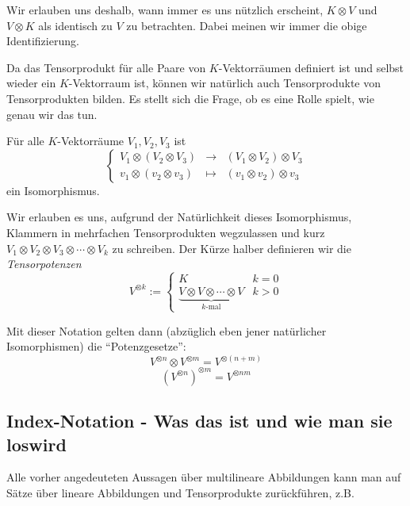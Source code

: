 \begin{remark}
Wir erlauben uns deshalb, wann immer es uns nützlich erscheint, $K\otimes V$ und $V\otimes K$ als identisch zu $V$ zu betrachten. Dabei meinen wir immer die obige Identifizierung.
\end{remark}

\begin{remark}
Da das Tensorprodukt für alle Paare von $K$-Vektorräumen definiert ist und selbst wieder ein $K$-Vektorraum ist, können wir natürlich auch Tensorprodukte von Tensorprodukten bilden. Es stellt sich die Frage, ob es eine Rolle spielt, wie genau wir das tun.
\end{remark}

\begin{lemmadef}
Für alle $K$-Vektorräume $V_1, V_2, V_3$ ist
\[\left\lbrace\begin{array}{rcl}
V_1\otimes(V_2\otimes V_3) &\to& (V_1\otimes V_2)\otimes V_3 \\
v_1\otimes (v_2\otimes v_3) &\mapsto& (v_1\otimes v_2)\otimes v_3
\end{array}\right.\]
ein Isomorphismus.

Wir erlauben es uns, aufgrund der Natürlichkeit dieses Isomorphismus, Klammern in mehrfachen Tensorprodukten wegzulassen und kurz $V_1\otimes V_2\otimes V_3\otimes\cdots\otimes V_k$ zu schreiben. Der Kürze halber definieren wir die \emph{Tensorpotenzen} 
\[V^{\otimes k} := \begin{cases} K & k=0 \\ 
\underbrace{V\otimes V\otimes\cdots\otimes V}_{k\text{-mal}} & k>0\end{cases}\]
\end{lemmadef}

\begin{remark}
Mit dieser Notation gelten dann (abzüglich eben jener natürlicher Isomorphismen) die \enquote{Potenzgesetze}:
\[V^{\otimes n}\otimes V^{\otimes m} = V^{\otimes(n+m)}\]
\[(V^{\otimes n})^{\otimes m} = V^{\otimes nm}\]
\end{remark}

\subsection{Index-Notation - Was das ist und wie man sie loswird}

\begin{remark}
Alle vorher angedeuteten Aussagen über multilineare Abbildungen kann man auf Sätze über lineare Abbildungen und Tensorprodukte zurückführen, z.B.
\end{remark}

